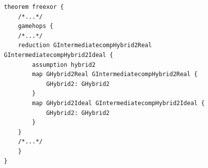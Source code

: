 \begin{longlisting}
\begin{verbatim}
theorem freexor {
    /*...*/
    gamehops {
    /*...*/
    reduction GIntermediatecompHybrid2Real GIntermediatecompHybrid2Ideal {
        assumption hybrid2
        map GHybrid2Real GIntermediatecompHybrid2Real {
            GHybrid2: GHybrid2
        }
        map GHybrid2Ideal GIntermediatecompHybrid2Ideal {
            GHybrid2: GHybrid2
        }
    }
    /*...*/
    }
}
\end{verbatim}
\caption{Game hop 6 in the  theorem}
\label{lst:domino-freexor-gamehop5}
\end{longlisting}
